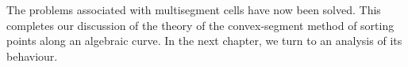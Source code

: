
The problems associated with multisegment cells have now been solved.
This completes our discussion of the theory of the convex-segment
method of sorting points along an algebraic curve.
In the next chapter, we turn to an analysis of its behaviour.
